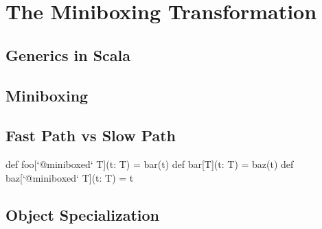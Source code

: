 \section{The Miniboxing Transformation}
\label{sec:minibox}


\subsection{Generics in Scala}





\subsection{Miniboxing}



\subsection{Fast Path vs Slow Path}


\begin{lstlisting-nobreak}
 def foo[`@miniboxed` T](t: T) = bar(t)
 def bar[T](t: T) = baz(t)
 def baz[`@miniboxed` T](t: T) = t
\end{lstlisting-nobreak}



\subsection{Object Specialization}





